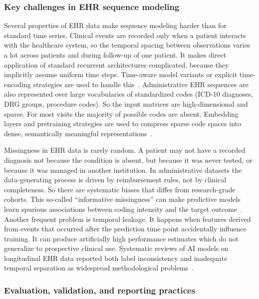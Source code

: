 \subsubsection{Key challenges in EHR sequence modeling}
\label{subsec:ehr_challenges}

Several properties of EHR data make sequence modeling harder than for standard time series. Clinical events are recorded only when a patient interacts with the healthcare system, so the temporal spacing between observations varies a lot across patients and during follow-up of one patient. It makes direct application of standard recurrent architectures complicated, because they implicitly assume uniform time steps. Time-aware model variants or explicit time-encoding strategies are used to handle this~\cite{carrasco_ribelles_2023_jamia, moglia_2025_bmc}. Administrative EHR sequences are also represented over large vocabularies of standardized codes (ICD-10 diagnoses, DRG groups, procedure codes). So the input matrices are high-dimensional and sparse. For most visits the majority of possible codes are absent. Embedding layers and pretraining strategies are used to compress sparse code spaces into dense, semantically meaningful representations~\cite{nature_claims_transformer_2022, pubmed_37652934}.

Missingness in EHR data is rarely random. A patient may not have a recorded diagnosis not because the condition is absent, but because it was never tested, or because it was managed in another institution. In administrative datasets the data-generating process is driven by reimbursement rules, not by clinical completeness. So there are systematic biases that differ from research-grade cohorts. This so-called ``informative missingness'' can make predictive models learn spurious associations between coding intensity and the target outcome~\cite{carrasco_ribelles_2023_jamia, moglia_2025_bmc}. Another frequent problem is temporal leakage. It happens when features derived from events that occurred after the prediction time point accidentally influence training. It can produce artificially high performance estimates which do not generalize to prospective clinical use. Systematic reviews of AI models on longitudinal EHR data reported both label inconsistency and inadequate temporal separation as widespread methodological problems~\cite{carrasco_ribelles_2023_jamia, moglia_2025_bmc}.

\subsubsection{Evaluation, validation, and reporting practices}
\label{subsec:eval_reporting}

